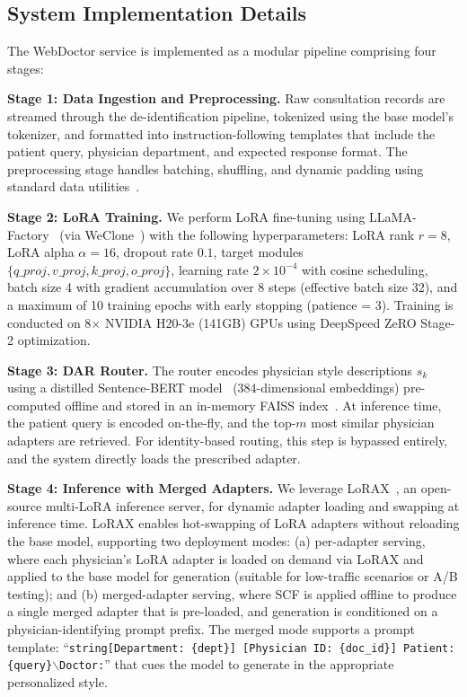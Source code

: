 \subsection{System Implementation Details}

The WebDoctor service is implemented as a modular pipeline comprising four stages:

\textbf{Stage 1: Data Ingestion and Preprocessing.} Raw consultation records are streamed through the de-identification pipeline, tokenized using the base model's tokenizer, and formatted into instruction-following templates that include the patient query, physician department, and expected response format. The preprocessing stage handles batching, shuffling, and dynamic padding using standard data utilities~\cite{zheng2024llamafactory}.

\textbf{Stage 2: LoRA Training.} We perform LoRA fine-tuning using LLaMA-Factory~\cite{zheng2024llamafactory} (via WeClone~\cite{xmingXming521WeClone2026}) with the following hyperparameters: LoRA rank $r = 8$, LoRA alpha $\alpha = 16$, dropout rate $0.1$, target modules $\{q\_proj, v\_proj, k\_proj, o\_proj\}$, learning rate $2 \times 10^{-4}$ with cosine scheduling, batch size 4 with gradient accumulation over 8 steps (effective batch size 32), and a maximum of 10 training epochs with early stopping (patience = 3). Training is conducted on 8$\times$ NVIDIA H20-3e (141GB) GPUs using DeepSpeed ZeRO Stage-2 optimization.

\textbf{Stage 3: DAR Router.} The router encodes physician style descriptions $s_k$ using a distilled Sentence-BERT model~\cite{reimers2019sentence} (384-dimensional embeddings) pre-computed offline and stored in an in-memory FAISS index~\cite{johnson2019faiss}. At inference time, the patient query is encoded on-the-fly, and the top-$m$ most similar physician adapters are retrieved. For identity-based routing, this step is bypassed entirely, and the system directly loads the prescribed adapter.

\textbf{Stage 4: Inference with Merged Adapters.} We leverage LoRAX~\cite{PredibaseLorax2026}, an open-source multi-LoRA inference server, for dynamic adapter loading and swapping at inference time. LoRAX enables hot-swapping of LoRA adapters without reloading the base model, supporting two deployment modes: (a) per-adapter serving, where each physician's LoRA adapter is loaded on demand via LoRAX and applied to the base model for generation (suitable for low-traffic scenarios or A/B testing); and (b) merged-adapter serving, where SCF is applied offline to produce a single merged adapter that is pre-loaded, and generation is conditioned on a physician-identifying prompt prefix. The merged mode supports a prompt template: ``\texttt{string[Department: \{dept\}] [Physician ID: \{doc\_id\}] Patient: \{query\}$\backslash$Doctor:}'' that cues the model to generate in the appropriate personalized style.

